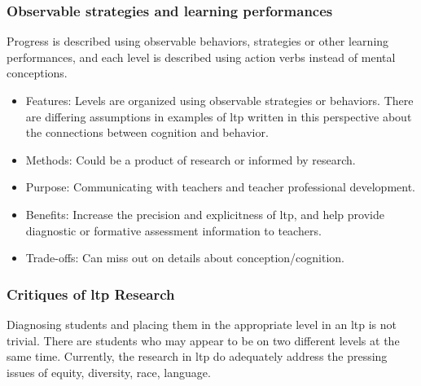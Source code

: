 \documentclass{TC}
\begin{document}
 
\subsubsection{Observable strategies and learning performances}
 
  Progress is described using observable behaviors, strategies or other learning performances, and each level is described using action verbs instead of mental conceptions.
  
\begin{multicols}{2}
\begin{itemize}
\item Features: Levels are organized using observable strategies or behaviors. There are differing assumptions in examples of \gls{ltp} written in this perspective about the connections between cognition and behavior.
\item Methods: Could be a product of research or informed by research.
\item Purpose: Communicating with teachers and teacher professional development. 
\item Benefits: Increase the precision and explicitness of \gls{ltp}, and help provide diagnostic or formative assessment information to teachers.
\item Trade-offs: Can miss out on details about conception/cognition. 
 \end{itemize}
 \end{multicols}
 
\subsubsection{Critiques of \gls{ltp} Research}

Diagnosing students and placing them in the appropriate level in an \gls{ltp} is not trivial. There are students who may appear to be on two different levels at the same time. Currently, the research in \gls{ltp} do adequately address the pressing issues of equity, diversity, race, language.
\end{document}
